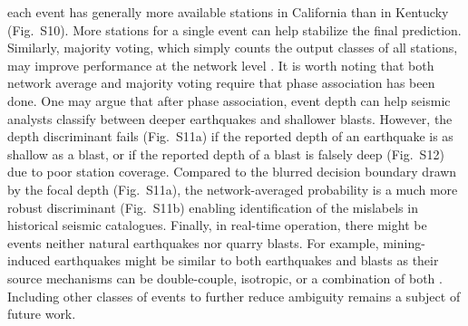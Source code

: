 \documentclass{gji}
\begin{document}
each event has generally more available stations in California than in Kentucky (Fig.~S10). More stations for a single event can help stabilize the final prediction. Similarly, majority voting, which simply counts the output classes of all stations, may improve performance at the network level \citep{liu}. It is worth noting that both network average and majority voting require that phase association has been done. One may argue that after phase association, event depth can help seismic analysts classify between deeper earthquakes and shallower blasts. However, the depth discriminant fails (Fig.~S11a) if the reported depth of an earthquake is as shallow as a blast, or if the reported depth of a blast is falsely deep (Fig.~S12) due to poor station coverage. Compared to the blurred decision boundary drawn by the focal depth (Fig.~S11a), the network-averaged probability is a much more robust discriminant (Fig.~S11b) enabling identification of the mislabels in historical seismic catalogues. Finally, in real-time operation, there might be events neither natural earthquakes nor quarry blasts. For example, mining-induced earthquakes might be similar to both earthquakes and blasts as their source mechanisms can be double-couple, isotropic, or a combination of both \citep{koper}. Including other classes of events to further reduce ambiguity remains a subject of future work.
\end{document}
